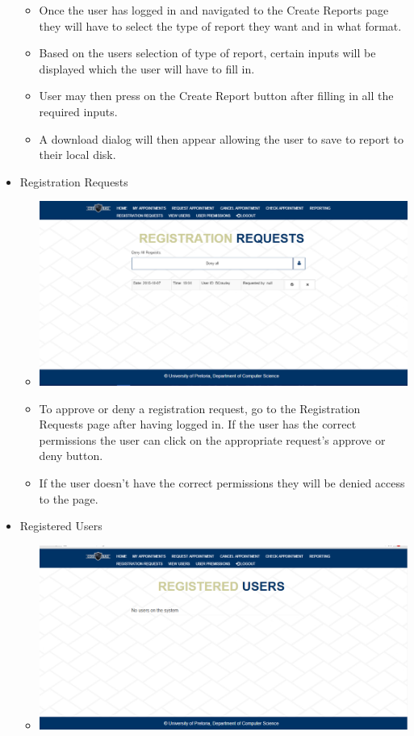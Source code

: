 \begin{itemize}
\begin{itemize}
				\item Once the user has logged in and navigated to the Create Reports page they will have to select the type of report they want and in what format.
				\item Based on the users selection of type of report, certain inputs will be displayed which the user will have to fill in.
				\item User may then press on the Create Report button after filling in all the required inputs.
				\item A download dialog will then appear allowing the user to save to report to their local disk.
			\end{itemize}
		\item Registration Requests
			\begin{itemize}
				\item \includegraphics[width=\linewidth]{images/Screenshots/RegistrationRequests.png}
				\item To approve or deny a registration request, go to the Registration Requests page after having logged in. If the user has the correct permissions the user can click on the appropriate request's approve or deny button.
				\item If the user doesn't have the correct permissions they will be denied access to the page.
			\end{itemize}
		\item Registered Users
			\begin{itemize}
				\item \includegraphics[width=\linewidth]{images/Screenshots/Registered_Users.png}

\end{itemize}
\end{itemize}
